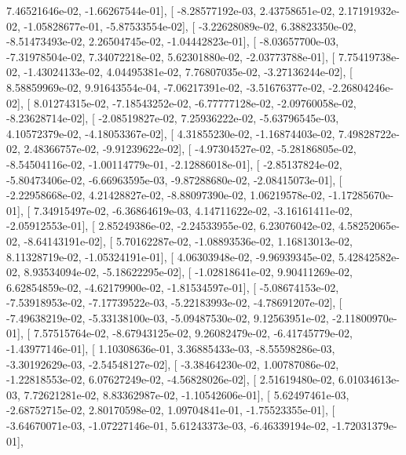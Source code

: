 \documentclass{article}
\begin{document}
          7.46521646e-02,  -1.66267544e-01],
       [ -8.28577192e-03,   2.43758651e-02,   2.17191932e-02,
         -1.05828677e-01,  -5.87533554e-02],
       [ -3.22628089e-02,   6.38823350e-02,  -8.51473493e-02,
          2.26504745e-02,  -1.04442823e-01],
       [ -8.03657700e-03,  -7.31978504e-02,   7.34072218e-02,
          5.62301880e-02,  -2.03773788e-01],
       [  7.75419738e-02,  -1.43024133e-02,   4.04495381e-02,
          7.76807035e-02,  -3.27136244e-02],
       [  8.58859969e-02,   9.91643554e-04,  -7.06217391e-02,
         -3.51676377e-02,  -2.26804246e-02],
       [  8.01274315e-02,  -7.18543252e-02,  -6.77777128e-02,
         -2.09760058e-02,  -8.23628714e-02],
       [ -2.08519827e-02,   7.25936222e-02,  -5.63796545e-03,
          4.10572379e-02,  -4.18053367e-02],
       [  4.31855230e-02,  -1.16874403e-02,   7.49828722e-02,
          2.48366757e-02,  -9.91239622e-02],
       [ -4.97304527e-02,  -5.28186805e-02,  -8.54504116e-02,
         -1.00114779e-01,  -2.12886018e-01],
       [ -2.85137824e-02,  -5.80473406e-02,  -6.66963595e-03,
         -9.87288680e-02,  -2.08415073e-01],
       [ -2.22958668e-02,   4.21428827e-02,  -8.88097390e-02,
          1.06219578e-02,  -1.17285670e-01],
       [  7.34915497e-02,  -6.36864619e-03,   4.14711622e-02,
         -3.16161411e-02,  -2.05912553e-01],
       [  2.85249386e-02,  -2.24533955e-02,   6.23076042e-02,
          4.58252065e-02,  -8.64143191e-02],
       [  5.70162287e-02,  -1.08893536e-02,   1.16813013e-02,
          8.11328719e-02,  -1.05324191e-01],
       [  4.06303948e-02,  -9.96939345e-02,   5.42842582e-02,
          8.93534094e-02,  -5.18622295e-02],
       [ -1.02818641e-02,   9.90411269e-02,   6.62854859e-02,
         -4.62179900e-02,  -1.81534597e-01],
       [ -5.08674153e-02,  -7.53918953e-02,  -7.17739522e-03,
         -5.22183993e-02,  -4.78691207e-02],
       [ -7.49638219e-02,  -5.33138100e-03,  -5.09487530e-02,
          9.12563951e-02,  -2.11800970e-01],
       [  7.57515764e-02,  -8.67943125e-02,   9.26082479e-02,
         -6.41745779e-02,  -1.43977146e-01],
       [  1.10308636e-01,   3.36885433e-03,  -8.55598286e-03,
         -3.30192629e-03,  -2.54548127e-02],
       [ -3.38464230e-02,   1.00787086e-02,  -1.22818553e-02,
          6.07627249e-02,  -4.56828026e-02],
       [  2.51619480e-02,   6.01034613e-03,   7.72621281e-02,
          8.83362987e-02,  -1.10542606e-01],
       [  5.62497461e-03,  -2.68752715e-02,   2.80170598e-02,
          1.09704841e-01,  -1.75523355e-01],
       [ -3.64670071e-03,  -1.07227146e-01,   5.61243373e-03,
         -6.46339194e-02,  -1.72031379e-01],
\end{document}

